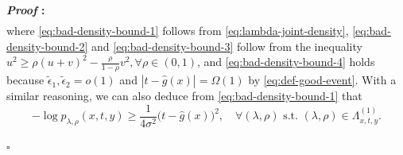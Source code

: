 \documentclass[10pt,a4paper]{amsart}
\def\eps{{\epsilon}}
\renewenvironment{proof}{\noindent\textbf{\textit{Proof }:}}{\hfill$\square$}
\begin{document}
\begin{proof}
\begin{subequations}
\begin{align}
        \end{align}
    \end{subequations}
    where \eqref{eq:bad-density-bound-1} follows from \eqref{eq:lambda-joint-density}, \eqref{eq:bad-density-bound-2} and \eqref{eq:bad-density-bound-3} follow from the inequality $u^2 \geq \rho (u+v)^2 - \frac{\rho}{1-\rho}v^2, \forall \rho\in(0,1)$, and \eqref{eq:bad-density-bound-4} holds because $\tilde{\eps}_1,\tilde{\eps}_2 = o(1)$ and $|t-\hat{g}(x)|=\Omega(1)$ by \eqref{eq:def-good-event}. With a similar reasoning, we can also deduce from \eqref{eq:bad-density-bound-1} that
    \begin{equation}
        \label{eq:bad-density-bound-single}
        -\log p_{\lambda,\rho}(x,t,y) \geq \frac{1}{4\sigma^2}\big(t-\hat{g}(x)\big)^2, \quad \forall(\lambda,\rho)\text{ s.t. } (\lambda,\rho)\in\Lambda_{x,t,y}^{(1)}.
    \end{equation}


\end{proof}
\end{document}
